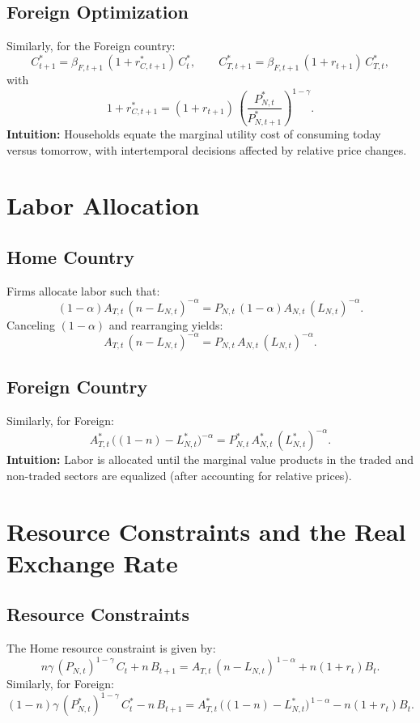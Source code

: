 \documentclass[a4paper,12pt]{article} %
\theoremstyle{nonitalic}
\begin{document}
\subsection*{Foreign Optimization}
Similarly, for the Foreign country:
\[
\boxed{C^*_{t+1} = \beta_{F,t+1}\,(1+r^*_{C,t+1})\,C^*_t, \qquad C^*_{T,t+1} = \beta_{F,t+1}\,(1+r_{t+1})\,C^*_{T,t},}
\]
with
\[
1+r^*_{C,t+1} = (1+r_{t+1})\,\left(\frac{P^*_{N,t}}{P^*_{N,t+1}}\right)^{1-\gamma}.
\]
\textbf{Intuition:} Households equate the marginal utility cost of consuming today versus tomorrow, with intertemporal decisions affected by relative price changes.

\section{Labor Allocation}

\subsection*{Home Country}
Firms allocate labor such that:
\[
(1-\alpha)A_{T,t}\,(n-L_{N,t})^{-\alpha} = P_{N,t}\,(1-\alpha)A_{N,t}\,(L_{N,t})^{-\alpha}.
\]
Canceling \( (1-\alpha) \) and rearranging yields:
\[
\boxed{A_{T,t}\,(n-L_{N,t})^{-\alpha} = P_{N,t}\,A_{N,t}\,(L_{N,t})^{-\alpha}.}
\]

\subsection*{Foreign Country}
Similarly, for Foreign:
\[
\boxed{A^*_{T,t}\,\big((1-n)-L^*_{N,t}\big)^{-\alpha} = P^*_{N,t}\,A^*_{N,t}\,(L^*_{N,t})^{-\alpha}.}
\]
\textbf{Intuition:} Labor is allocated until the marginal value products in the traded and non-traded sectors are equalized (after accounting for relative prices).

\section{Resource Constraints and the Real Exchange Rate}

\subsection*{Resource Constraints}
The Home resource constraint is given by:
\[
n\gamma\,(P_{N,t})^{1-\gamma}\,C_t + n\,B_{t+1} = A_{T,t}\,(n-L_{N,t})^{\,1-\alpha} + n(1+r_t)B_t.
\]
Similarly, for Foreign:
\[
(1-n)\gamma\,(P^*_{N,t})^{1-\gamma}\,C^*_t - n\,B_{t+1} = A^*_{T,t}\,\big((1-n)-L^*_{N,t}\big)^{\,1-\alpha} - n(1+r_t)B_t.
\]
\end{document}

